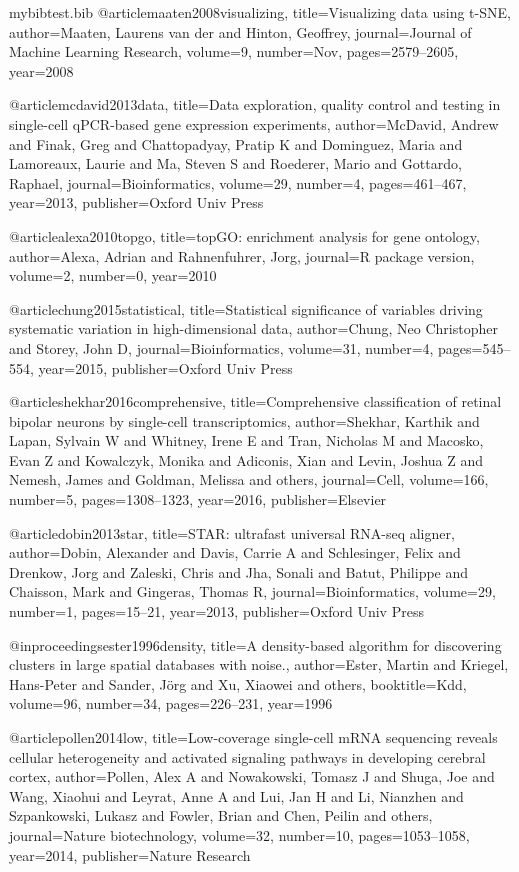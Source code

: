 \begin{filecontents}{mybibtest.bib}
@article{maaten2008visualizing,
  title={Visualizing data using t-SNE},
  author={Maaten, Laurens van der and Hinton, Geoffrey},
  journal={Journal of Machine Learning Research},
  volume={9},
  number={Nov},
  pages={2579--2605},
  year={2008}
}

@article{mcdavid2013data,
  title={Data exploration, quality control and testing in single-cell qPCR-based gene expression experiments},
  author={McDavid, Andrew and Finak, Greg and Chattopadyay, Pratip K and Dominguez, Maria and Lamoreaux, Laurie and Ma, Steven S and Roederer, Mario and Gottardo, Raphael},
  journal={Bioinformatics},
  volume={29},
  number={4},
  pages={461--467},
  year={2013},
  publisher={Oxford Univ Press}
}

@article{alexa2010topgo,
  title={topGO: enrichment analysis for gene ontology},
  author={Alexa, Adrian and Rahnenfuhrer, Jorg},
  journal={R package version},
  volume={2},
  number={0},
  year={2010}
}	

@article{chung2015statistical,
  title={Statistical significance of variables driving systematic variation in high-dimensional data},
  author={Chung, Neo Christopher and Storey, John D},
  journal={Bioinformatics},
  volume={31},
  number={4},
  pages={545--554},
  year={2015},
  publisher={Oxford Univ Press}
}

@article{shekhar2016comprehensive,
  title={Comprehensive classification of retinal bipolar neurons by single-cell transcriptomics},
  author={Shekhar, Karthik and Lapan, Sylvain W and Whitney, Irene E and Tran, Nicholas M and Macosko, Evan Z and Kowalczyk, Monika and Adiconis, Xian and Levin, Joshua Z and Nemesh, James and Goldman, Melissa and others},
  journal={Cell},
  volume={166},
  number={5},
  pages={1308--1323},
  year={2016},
  publisher={Elsevier}
}

@article{dobin2013star,
  title={STAR: ultrafast universal RNA-seq aligner},
  author={Dobin, Alexander and Davis, Carrie A and Schlesinger, Felix and Drenkow, Jorg and Zaleski, Chris and Jha, Sonali and Batut, Philippe and Chaisson, Mark and Gingeras, Thomas R},
  journal={Bioinformatics},
  volume={29},
  number={1},
  pages={15--21},
  year={2013},
  publisher={Oxford Univ Press}
}

@inproceedings{ester1996density,
  title={A density-based algorithm for discovering clusters in large spatial databases with noise.},
  author={Ester, Martin and Kriegel, Hans-Peter and Sander, J{\"o}rg and Xu, Xiaowei and others},
  booktitle={Kdd},
  volume={96},
  number={34},
  pages={226--231},
  year={1996}
}

@article{pollen2014low,
  title={Low-coverage single-cell mRNA sequencing reveals cellular heterogeneity and activated signaling pathways in developing cerebral cortex},
  author={Pollen, Alex A and Nowakowski, Tomasz J and Shuga, Joe and Wang, Xiaohui and Leyrat, Anne A and Lui, Jan H and Li, Nianzhen and Szpankowski, Lukasz and Fowler, Brian and Chen, Peilin and others},
  journal={Nature biotechnology},
  volume={32},
  number={10},
  pages={1053--1058},
  year={2014},
  publisher={Nature Research}
}

\end{filecontents}

